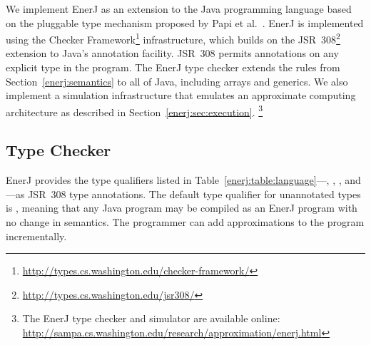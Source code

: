 We implement EnerJ as an extension to the Java
programming language based on the
pluggable type mechanism proposed by Papi et al.~\cite{papi}.
EnerJ is implemented using the
Checker Framework\footnote{\url{http://types.cs.washington.edu/checker-framework/}}
infrastructure,
which builds on the
JSR~308\footnote{\url{http://types.cs.washington.edu/jsr308/}}
extension to Java's annotation facility. JSR~308 permits annotations on
any explicit type in the program.
The EnerJ type checker extends the rules from Section~\ref{enerj:semantics} to all of
Java, including arrays and generics.
We also implement a simulation infrastructure that emulates an
approximate computing architecture as described in Section~\ref{enerj:sec:execution}.
\footnote{The EnerJ type checker and simulator
are available online:
\url{http://sampa.cs.washington.edu/research/approximation/enerj.html}
}

\subsection{Type Checker}
\label{enerj:checker}
EnerJ provides the type qualifiers listed
in Table~\ref{enerj:table:language}---, ,
, and ---as JSR~308 type annotations.
The default type qualifier for unannotated types is , meaning
that any Java program may be compiled as an EnerJ program with no change in
semantics. The programmer can add approximations to the
program incrementally.



